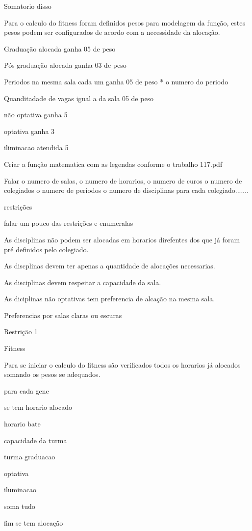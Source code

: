 \documentclass{abntpuc}
\begin{document}

Somatorio disso

Para o calculo do fitness foram definidos pesos para modelagem da função, estes pesos podem ser configurados de acordo com a necessidade da alocação.

Graduação alocada ganha 05 de peso

Pós graduação alocada ganha 03 de peso

Periodos na mesma sala cada um ganha 05 de peso * o numero do periodo

Quanditadade de vagas igual a da sala 05 de peso

não optativa ganha 5

optativa ganha 3

iliminacao atendida 5

Criar a função matematica com as legendas conforme o trabalho 117.pdf

Falar o numero de salas, o numero de horarios, o numero de curos o numero de colegiados o numero de periodos o numero de disciplinas para cada colegiado.......

restrições 


falar um pouco das restrições e enumeralas

As disciplinas não podem ser alocadas em horarios direfentes dos que já foram pré definidos pelo colegiado.

As discplinas devem ter apenas a quantidade de alocações necessarias.

As disciplinas devem respeitar a capacidade da sala.

As diciplinas não optativas tem preferencia de alcação na mesma sala.

Preferencias por salas claras ou escuras

Restrição 1 


Fitness

Para se iniciar o calculo do fitness são verificados todos os horarios já alocados somando os pesos se adequados.

para cada gene

se tem horario alocado 

horario bate

capacidade da turma

turma graduacao

optativa

iluminacao

soma tudo

fim se tem alocação
\end{document}
